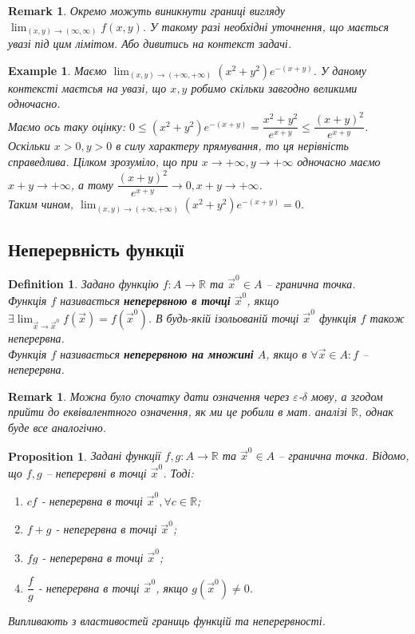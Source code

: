 \documentclass[a4paper, 10pt]{article}
\def\huge{\displaystyle}
\theoremstyle{theoremdd}
\theoremstyle{theoremdd}
\theoremstyle{theoremdd}
\newtheorem{definition}[theorem]{Definition}
\theoremstyle{theoremdd}
\theoremstyle{theoremdd}
\newtheorem{example}[theorem]{Example}
\theoremstyle{theoremdd}
\newtheorem{proposition}[theorem]{Proposition}
\theoremstyle{theoremdd}
\newtheorem{remark}[theorem]{Remark}
\theoremstyle{theoremdd}
\theoremstyle{theoremdd}
\begin{document}
\begin{remark}
Окремо можуть виникнути границі вигляду $\displaystyle\lim_{(x,y) \to (\infty,\infty)} f(x,y)$. У такому разі необхідні уточнення, що мається увазі під цим лімітом. Або дивитись на контекст задачі.
\end{remark}

\begin{example}
Маємо $\displaystyle\lim_{(x,y) \to (+\infty,+\infty)} (x^2+y^2) e^{-(x+y)}$. У даному контексті маєтсья на увазі, що $x,y$ робимо скільки завгодно великими одночасно.\\
Маємо ось таку оцінку: $0 \leq (x^2+y^2)e^{-(x+y)} = \dfrac{x^2+y^2}{e^{x+y}} \leq \dfrac{(x+y)^2}{e^{x+y}}$.\\
Оскільки $x>0,y>0$ в силу характеру прямування, то ця нерівність справедлива. Цілком зрозуміло, що при $x \to +\infty, y \to +\infty$ одночасно маємо $x+y \to +\infty$, а тому $\dfrac{(x+y)^2}{e^{x+y}} \to 0, x+y \to +\infty$.\\
Таким чином, $\displaystyle\lim_{(x,y) \to (+\infty,+\infty)} (x^2+y^2) e^{-(x+y)} = 0$.
\end{example}

\subsection{Неперервність функції}
\begin{definition}
Задано функцію $f \colon A \to \mathbb{R}$ та $\vec{x}^0 \in A$ -- гранична точка.\\
Функція $f$ називається \textbf{неперервною в точці} $\vec{x}^0$, якщо $\exists \huge \lim_{\vec{x} \to \vec{x}^0} f(\vec{x}) = f(\vec{x}^0)$. В будь-якій ізольованій точці $\vec{x}^0$ функція $f$ також неперервна.\\
Функція $f$ називається \textbf{неперервною на множині} $A$, якщо в $\forall \vec{x} \in A: f$ -- неперервна.
\end{definition}

\begin{remark}
Можна було спочатку дати означення через $\varepsilon$-$\delta$ мову, а згодом прийти до еквівалентного означення, як ми це робили в мат. аналізі $\mathbb{R}$, однак буде все аналогічно.
\end{remark}

\begin{proposition}
Задані функції $f,g \colon A \to \mathbb{R}$ та $\vec{x}^0 \in A$ -- гранична точка. Відомо, що $f,g$ -- неперервні в точці $\vec{x}^0$. Тоді:
\begin{enumerate}[nosep,wide=0pt,label={\arabic*)}]
\item $cf$ - неперервна в точці $\vec{x}^0, \forall c \in \mathbb{R}$;
\item $f+g$ - неперервна в точці $\vec{x}^0$;
\item $fg$ - неперервна в точці $\vec{x}^0$;
\item $\dfrac{f}{g}$ - неперервна в точці $\vec{x}^0$, якщо $g(\vec{x}^0) \neq 0$.
\end{enumerate}
\textit{Випливають з властивостей границь функцій та неперервності.}
\end{proposition}
\end{document}
